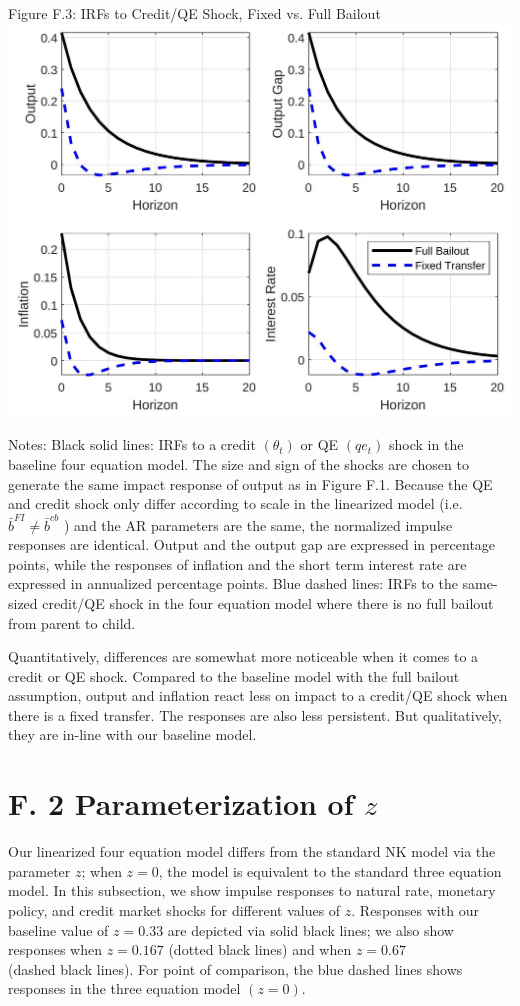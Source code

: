 \documentclass[10pt]{article}
\begin{document}
Figure F.3: IRFs to Credit/QE Shock, Fixed vs. Full Bailout\\
\includegraphics[max width=\textwidth, center]{2024_12_20_23d1456f4ac472ebd83dg-13}

Notes: Black solid lines: IRFs to a credit $\left(\theta_{t}\right)$ or QE $\left(q e_{t}\right)$ shock in the baseline four equation model. The size and sign of the shocks are chosen to generate the same impact response of output as in Figure F.1. Because the QE and credit shock only differ according to scale in the linearized model (i.e. $\bar{b}^{F I} \neq \bar{b}^{c b}$ ) and the AR parameters are the same, the normalized impulse responses are identical. Output and the output gap are expressed in percentage points, while the responses of inflation and the short term interest rate are expressed in annualized percentage points. Blue dashed lines: IRFs to the same-sized credit/QE shock in the four equation model where there is no full bailout from parent to child.

Quantitatively, differences are somewhat more noticeable when it comes to a credit or QE shock. Compared to the baseline model with the full bailout assumption, output and inflation react less on impact to a credit/QE shock when there is a fixed transfer. The responses are also less persistent. But qualitatively, they are in-line with our baseline model.

\section*{F. 2 Parameterization of $z$}
Our linearized four equation model differs from the standard NK model via the parameter $z$; when $z=0$, the model is equivalent to the standard three equation model. In this subsection, we show impulse responses to natural rate, monetary policy, and credit market shocks for different values of $z$. Responses with our baseline value of $z=0.33$ are depicted via solid black lines; we also show responses when $z=0.167$ (dotted black lines) and when $z=0.67$\\
(dashed black lines). For point of comparison, the blue dashed lines shows responses in the three equation model $(z=0)$.
\end{document}
